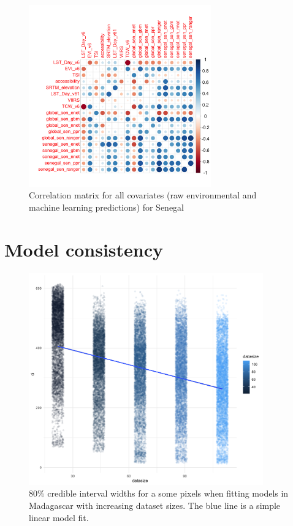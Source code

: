 \documentclass[review]{elsarticle}
\begin{document}
\begin{figure}[h!]
  \centering
  \includegraphics[width=0.7\textwidth]{figs/SI/sen_correlation_plot.png}
\caption{
  Correlation matrix for all covariates (raw environmental and machine learning predictions) for Senegal}

\end{figure}






\clearpage
\section{Model consistency}




\begin{figure}[h!]
  \centering
  \includegraphics[width=0.9\textwidth]{figs/SI/pix_consistency_cis.png}
\caption{80\% credible interval widths for a some pixels when fitting models in Madagascar with increasing dataset sizes. The blue line is a simple linear model fit.}

\end{figure}




% 
%
%
\end{document}

